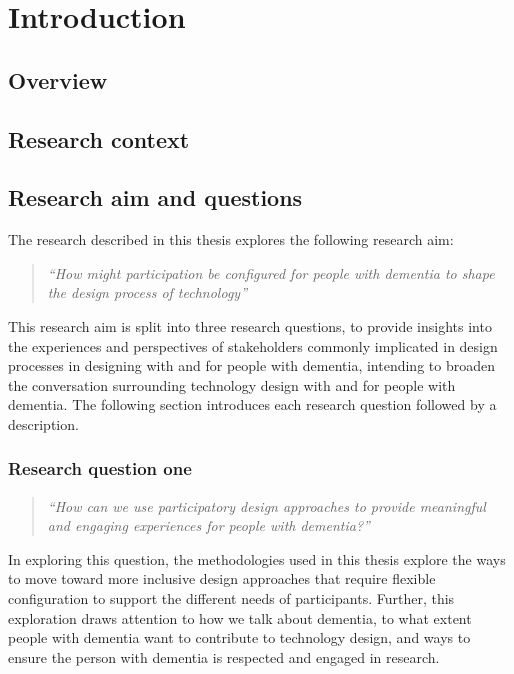 \chapter{Introduction}

\section{Overview}
\label{Intro: Overiew}

\section{Research context}
\label{Intro: ResearchContext}

\section{Research aim and questions}
\label{Intro:RQ}
The research described in this thesis explores the following research aim:
\begin{quote}
    \textit{``How might participation be configured for people with dementia to shape the design process of technology''}
\end{quote}
This research aim is split into three research questions, to provide insights into the experiences and perspectives of stakeholders commonly implicated in design processes in designing with and for people with dementia, intending to broaden the conversation surrounding technology design with and for people with dementia. The following section introduces each research question followed by a description.

\subsection{Research question one}
\label{RQ1}
\begin{quote}
\textit{``How can we use participatory design approaches to provide meaningful and engaging experiences for people with dementia?''}
\end{quote}
In exploring this question, the methodologies used in this thesis explore the ways to move toward more inclusive design approaches that require flexible configuration to support the different needs of participants. Further, this exploration draws attention to how we talk about dementia, to what extent people with dementia want to contribute to technology design, and ways to ensure the person with dementia is respected and engaged in research.

